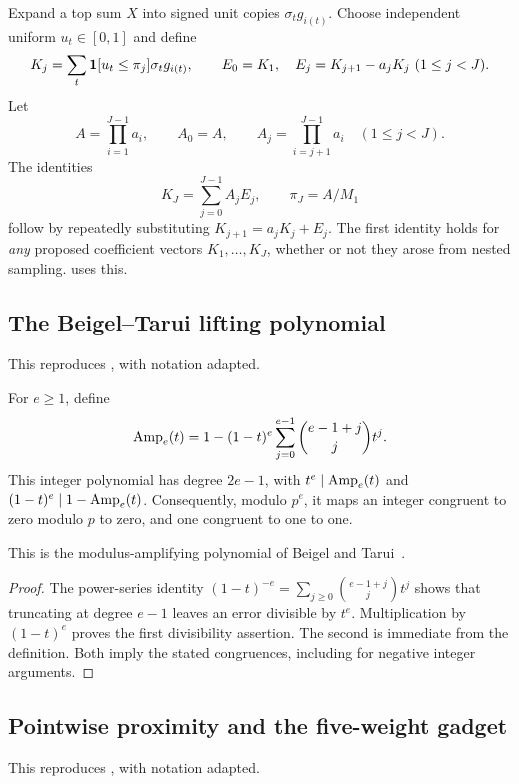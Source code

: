 Expand a top sum \(X\) into signed unit copies \(\sigma_tg_{i(t)}\).
Choose independent uniform \(u_t\in[0,1]\) and define
\[
 K_j=\sum_t\mathbf 1[u_t\le\pi_j]\sigma_tg_{i(t)},\qquad
 E_0=K_1,\quad E_j=K_{j+1}-a_jK_j\ (1\le j<J).
\]
Let
\[
 A=\prod_{i=1}^{J-1}a_i,\qquad A_0=A,\qquad
 A_j=\prod_{i=j+1}^{J-1}a_i\quad(1\le j<J).
\]
The identities
\begin{equation}\label{earlier:g:eq:telescope}
 K_J=\sum_{j=0}^{J-1}A_jE_j,\qquad \pi_J=A/M_1
\end{equation}
follow by repeatedly substituting \(K_{j+1}=a_jK_j+E_j\).
The first identity holds for \emph{any} proposed coefficient vectors
\(K_1,\ldots,K_J\), whether or not they arose from nested sampling.
 uses this.



\subsection{The Beigel--Tarui lifting polynomial}
\label{earlier:gate-amp}
This reproduces \cite[Lemma~6.6]{NagCG}, with notation adapted.

\begin{lemma}\label{earlier:g:lem:amp}
For \(e\ge1\), define
\[
 \mathrm{Amp}_e(t)=1-(1-t)^e\sum_{j=0}^{e-1}\binom{e-1+j}{j}t^j.
\]
This integer polynomial has degree \(2e-1\), with
\(t^e\mid\mathrm{Amp}_e(t)\) and \((1-t)^e\mid1-\mathrm{Amp}_e(t)\).
Consequently, modulo \(p^e\), it maps an integer congruent to zero
modulo \(p\) to zero, and one congruent to one to one.
\end{lemma}
This is the modulus-amplifying polynomial of Beigel and
Tarui~\cite[Section~2.3]{BT94}.
\begin{proof}
The power-series identity
\((1-t)^{-e}=\sum_{j\ge0}\binom{e-1+j}{j}t^j\) shows that truncating
at degree \(e-1\) leaves an error divisible by \(t^e\).
Multiplication by \((1-t)^e\) proves the first divisibility assertion.
The second is immediate from the definition. Both imply the stated
congruences, including for negative integer arguments.
\end{proof}



\subsection{Pointwise proximity and the five-weight gadget}
\label{earlier:gate-pcpp-gadget}
This reproduces \cite[Sections~11.1--11.3]{NagCG}, with notation adapted.


